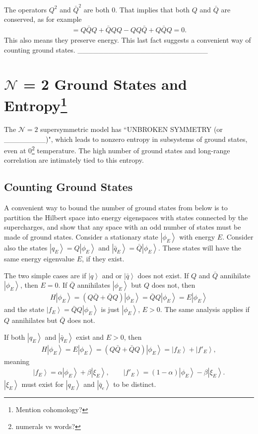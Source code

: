 \documentclass[12pt]{article} %
\renewcommand{\cal}{\mathcal}
\newcommand{\ket}[1]{\left|#1\right\rangle}
\begin{document}
The operators $Q^2$ and $\bar Q^2$ are both 0. That implies that both $Q$ and $\bar Q$ are conserved, as for example
\begin{align}
[H,Q] = Q\bar QQ + \bar QQQ - QQ\bar Q + Q\bar QQ = 0.
\end{align}
This also means they preserve energy. This last fact suggests a convenient way of counting ground states. \_\_\_\_\_\_\_\_\_\_\_\_\_\_\_\_\_\_\_\_\_\_\_\_\_

\section{$\cal{N}$ = 2 Ground States and Entropy\protect\footnote{Mention cohomology?}}

The $\cal N = 2$ supersymmetric model has ``UNBROKEN SYMMETRY (or \_\_\_\_\_\_\_\_)", which leads to nonzero entropy in subsystems of ground states, even at 0\footnote{numerals vs words?} temperature. The high number of ground states and long-range correlation are intimately tied to this entropy.

\subsection{Counting Ground States} \emph{}

A convenient way to bound the number of ground states from below is to partition the Hilbert space into energy eigenspaces with states connected by the supercharges, and show that any space with an odd number of states must be made of ground states. Consider a stationary state $\ket{\phi_E}$ with energy $E$. Consider also the states $\ket{q_E} = Q\ket{\phi_E}$ and $\ket{\bar q_E}= \bar Q \ket{\phi_E}$. These states will have the same energy eigenvalue $E$, if they exist. 

The two simple cases are if $\ket{q}$ and or $\ket{\bar q}$ does not exist. If $Q$ and $\bar Q$ annihilate $\ket{\phi_E}$, then $E=0$. If $\bar Q$ annihilates $\ket{\phi_E}$ but $Q$ does not, then 
\begin{align}
H\ket{\phi_E} = (Q\bar{Q} + \bar QQ)\ket{\phi_E} = \bar QQ\ket{\phi_E} = E\ket{\phi_E}
\end{align}
and the state $\ket{f_E} = \bar QQ\ket{\phi_E}$ is just $\ket{\phi_E}$, $E>0$. The same analysis applies if $Q$ annihilates but $\bar Q$ does not.

If both $\ket{q_E}$ and $\ket{\bar q_E}$ exist and $E>0$, then
\begin{align}
H\ket{\phi_E} = E\ket{\phi_E} = (Q\bar Q + \bar QQ)\ket{\phi_E} = \ket{f_E} + 
	\ket{f'_E},
\end{align}
meaning 
\begin{align}
\ket{f_E} = \alpha\ket{\phi_E} + \beta\ket{\xi_E},\qquad \ket{f'_E} = 
	(1-\alpha)\ket{\phi_E} - \beta\ket{\xi_E}.
\end{align}
$\ket{\xi_E}$ must exist for $\ket{q_E}$ and $\ket{\bar q_e}$ to be distinct.
\end{document}
